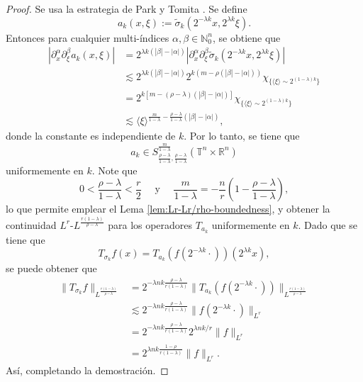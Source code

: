 \begin{proof}
	Se usa la estrategia de Park y Tomita \cite{park-tomita}. Se define    
	\begin{equation*}
		a_k(x, \xi) := \tilde{\sigma}_k(2^{-\lambda k}x, 2^{\lambda k} \xi).
	\end{equation*}
	Entonces para cualquier multi-índices $\alpha, \beta \in \mathbb{N}_0^n$, se obtiene que
	\begin{align*}
		|\partial_x^\alpha\partial_\xi^\beta a_k(x, \xi)| & = 2^{\lambda k(|\beta|-|\alpha|)} |\partial_x^\alpha\partial_\xi^\beta \tilde{\sigma}_k(2^{-\lambda k}x, 2^{\lambda k} \xi)| \\
		& \lesssim 2^{\lambda k(|\beta|-|\alpha|)} 2^{k(m - \rho(|\beta|-|\alpha|))} \chi_{ \{ \langle\xi\rangle \sim 2^{(1-\lambda)k} \} } \\
		& =  2^{ k[m - (\rho-\lambda)(|\beta|-|\alpha|)] } \chi_{ \{ \langle\xi\rangle \sim 2^{(1-\lambda)k} \} } \\
		& \lesssim  \langle\xi\rangle^{ \frac{m}{1-\lambda}  -  \frac{\rho-\lambda}{1-\lambda}(|\beta|-|\alpha|) },
	\end{align*}
	donde la constante es independiente de $k$. Por lo tanto, se tiene que 
	\begin{equation*}
		a_k \in S^{\frac{m}{1-\lambda}}_{ \frac{\rho-\lambda}{1-\lambda} , \frac{\rho-\lambda}{1-\lambda} } (\mathbb{T}^n\times\mathbb{R}^n)
	\end{equation*}
	uniformemente en $k$. Note que 
	\begin{equation*}
		0 < \frac{\rho-\lambda}{1-\lambda} < \frac{r}{2} \quad \text{ y } \quad \frac{m}{1-\lambda} = -\frac{n}{r} \left(  1 - \frac{\rho-\lambda}{1-\lambda}
		\right),
	\end{equation*}
	lo que permite emplear el Lema \ref{lem:Lr-Lr/rho-boundedness}, y obtener la continuidad $L^r$-$L^\frac{r(1-\lambda)}{\rho-\lambda}$ para los operadores $T_{a_k}$ uniformemente en $k$. Dado que se tiene que 
	\begin{equation*}
		T_{\sigma_k}f(x) = T_{a_k}(f(2^{-\lambda k}\cdot ))(2^{
			\lambda k
		}x),
	\end{equation*}
	se puede obtener que 
	\begin{align*}
		\|T_{\sigma_k}f\|_{L^\frac{r(1-\lambda)}{\rho-\lambda}} &= 2^{ -\lambda nk \frac{\rho-\lambda}{r(1-\lambda)} } \|T_{a_k}(f(2^{-\lambda k} \cdot))\|_{L^\frac{r(1-\lambda)}{\rho-\lambda}} \\
		& \lesssim 2^{ -\lambda nk \frac{\rho-\lambda}{r(1-\lambda)} } \|f(2^{-\lambda k} \cdot)\|_{L^r} \\
		& =  2^{ -\lambda nk \frac{\rho-\lambda}{r(1-\lambda)} } 2^{\lambda nk/r} \|f\|_{L^r} \\
		& =  2^{ \lambda nk \frac{1-\rho}{r(1-\lambda)} } \|f\|_{L^r}.
	\end{align*}
	Así, completando la demostración.
\end{proof}
